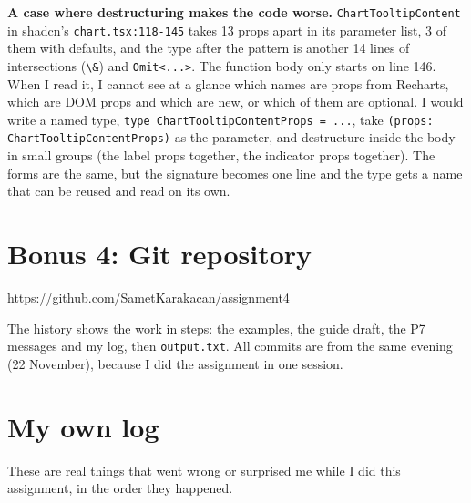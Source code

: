 \documentclass[
]{article}
\newcommand{\passthrough}[1]{#1}
\begin{document}
\textbf{A case where destructuring makes the code worse.}
\passthrough{\lstinline!ChartTooltipContent!} in shadcn's
\passthrough{\lstinline!chart.tsx:118-145!} takes 13 props apart in its
parameter list, 3 of them with defaults, and the type after the pattern
is another 14 lines of intersections (\passthrough{\lstinline!\&!}) and
\passthrough{\lstinline!Omit<...>!}. The function body only starts on
line 146. When I read it, I cannot see at a glance which names are props
from Recharts, which are DOM props and which are new, or which of them
are optional. I would write a named type,
\passthrough{\lstinline!type ChartTooltipContentProps = ...!}, take
\passthrough{\lstinline!(props: ChartTooltipContentProps)!} as the
parameter, and destructure inside the body in small groups (the label
props together, the indicator props together). The forms are the same,
but the signature becomes one line and the type gets a name that can be
reused and read on its own.

\hypertarget{bonus-4-git-repository}{%
\section{Bonus 4: Git repository}\label{bonus-4-git-repository}}

https://github.com/SametKarakacan/assignment4

The history shows the work in steps: the examples, the guide draft, the
P7 messages and my log, then \passthrough{\lstinline!output.txt!}. All
commits are from the same evening (22 November), because I did the
assignment in one session.

\hypertarget{my-own-log}{%
\section{My own log}\label{my-own-log}}

These are real things that went wrong or surprised me while I did this
assignment, in the order they happened.
\end{document}
